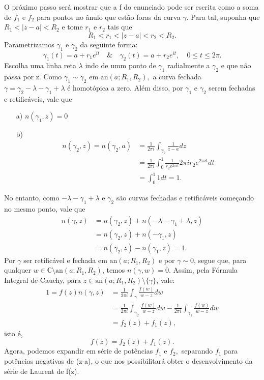 \documentclass[complex.tex]{subfiles}
\begin{document}
\begin{proof*}
	O próximo passo será mostrar que a f do enunciado pode ser escrita como a soma de \(f_{1}\) e \(f_{2}\) para pontos no ânulo que estão
	foras da curva \(\gamma \). Para tal, suponha que \(R_{1} < |z-a| < R_{2}\) e tome \(r_1\) e \(r_{2}\) tais que
	\[
		R_{1} < r_{1} < |z-a| < r_{2} < R_{2}.
	\]
	Parametrizamos \(\gamma_{1}\) e \(\gamma_{2}\) da seguinte forma:
	\[
		\gamma _{1}(t) = a + r_{1}e^{it}\quad\&\quad \gamma_{2}(t) = a + r_{2}e^{it},\quad 0\leq t\leq 2\pi .
	\]
	Escolha uma linha reta \(\lambda \) indo de umm ponto de \(\gamma_{1}\) radialmente a \(\gamma _{2}\) e que não passa por z.
	Como \(\gamma _{1}\sim \gamma _{2}\) em \(\mathrm{an}(a; R_{1}, R_{2}),\) a curva fechada \(\gamma  = \gamma_{2} - \lambda -\gamma _{1} + \lambda \) é homotópica
	a zero. Além disso, por \(\gamma _{1}\) e \(\gamma _{2}\) serem fechadas e retificáveis, vale que
	\begin{itemize}
		\item[a)] \(n(\gamma_{1}, z) = 0\)
		\item[b)]
		      \begin{align*}
			      n(\gamma_{2}, z) = n(\gamma_{2}, a) & = \frac{1}{2\pi i}\int_{\gamma_{2}}^{}\frac{1}{z-a}dz                             \\
			                                          & = \frac{1}{2\pi i}\int_{0}^{1}\frac{1}{r_{2}e^{2\pi it}}2\pi ir_{2}e^{2\pi it }dt \\
			                                          & = \int_{0}^{1}1dt = 1.
		      \end{align*}
	\end{itemize}
	No entanto, como \(-\lambda -\gamma _{1}+\lambda \) e \(\gamma _{2}\) são curvas fechadas e retificáveis começando no mesmo ponto,
	vale que
	\begin{align*}
		n(\gamma , z) & = n(\gamma_{2}, z) + n (-\lambda -\gamma _{1} + \lambda , z) \\
		              & = n(\gamma_{2}, z) + n(-\gamma_{1}, z)                       \\
		              & = n(\gamma_{2}, z) - n(\gamma_{1}, z) = 1.
	\end{align*}
	Por \(\gamma \) ser retificável e fechada em \(\mathrm{an}(a; R_{1}, R_{2})\) e por \(\gamma \sim 0\), segue que, para
	qualquer \(w\in \mathbb{C}\setminus{\mathrm{an}(a; R_{1}, R_{2})}\), temos \(n(\gamma, w) = 0.\) Assim, pela Fórmula Integral de Cauchy,
	para \(z\in \mathrm{an}(a; R_{1}, R_{2})\setminus{\{\gamma \}}\), vale:
	\begin{align*}
		1 = f(z)n(\gamma , z) & = \frac{1}{2\pi i}\int_{\gamma }^{}\frac{f(w)}{w-z}dw                                                               \\
		                      & = \frac{1}{2\pi i}\int_{\gamma _{2}}^{}\frac{f(w)}{w-z}dw - \frac{1}{2\pi i}\int_{\gamma _{1}}^{}\frac{f(w)}{w-z}dw \\
		                      & = f_{2}(z) + f_{1}(z),
	\end{align*}
	isto é,
	\[
		f(z) = f_{2}(z) + f_{1}(z).
	\]
	Agora, podemos expandir em série de potências \(f_{1}\) e \(f_{2},\) separando \(f_{1}\) para potências negativas de (z-a), o que nos possibilitará obter
	o desenvolvimento da série de Laurent de f(z).


\end{proof*}
\end{document}
